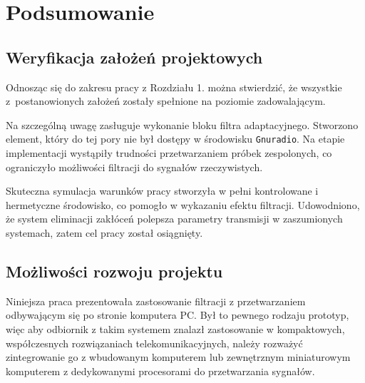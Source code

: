 \chapter{Podsumowanie}
\section{Weryfikacja założeń projektowych}
Odnosząc się do zakresu pracy z Rozdziału 1. można stwierdzić, że wszystkie z~postanowionych założeń zostały spełnione na poziomie zadowalającym.

Na szczególną uwagę zasługuje wykonanie bloku filtra adaptacyjnego.
Stworzono element, który do tej pory nie był dostępy w środowisku \texttt{Gnuradio}.
Na etapie implementacji wystąpiły trudności przetwarzaniem próbek zespolonych, co ograniczyło możliwości filtracji do sygnałów rzeczywistych.

Skuteczna symulacja warunków pracy stworzyła w pełni kontrolowane i hermetyczne środowisko, co pomogło w wykazaniu efektu filtracji.
Udowodniono, że system eliminacji zakłóceń polepsza parametry transmisji w zaszumionych systemach, zatem cel pracy został osiągnięty.



\section{Możliwości rozwoju projektu}
Niniejsza praca prezentowała zastosowanie filtracji z przetwarzaniem odbywającym się po stronie komputera PC. Był to pewnego rodzaju prototyp, więc aby odbiornik z takim systemem znalazł zastosowanie w kompaktowych, współczesnych rozwiązaniach telekomunikacyjnych, należy rozważyć zintegrowanie go z wbudowanym komputerem lub zewnętrznym miniaturowym komputerem z dedykowanymi procesorami do przetwarzania sygnałów. 